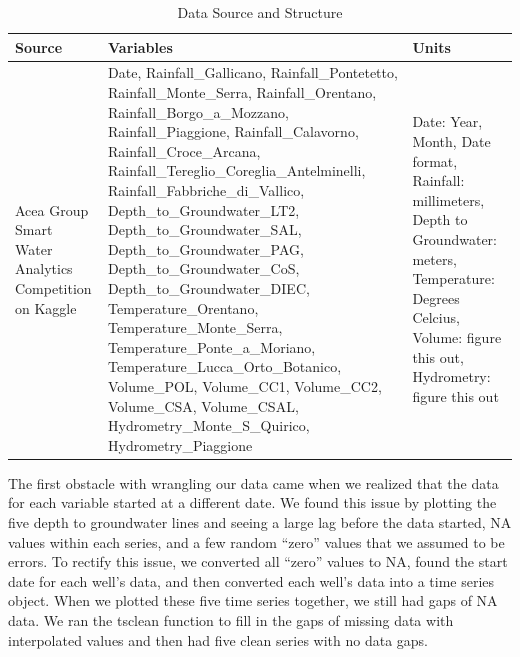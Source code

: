 \documentclass[
]{article}
\begin{document}
\begin{table}[!h]

\caption{\label{tab:unnamed-chunk-2}Data Source and Structure}
\centering
\begin{tabular}[t]{l|l|l}
\hline
Source & Variables & Units\\
\hline
Acea Group Smart Water Analytics Competition on Kaggle & Date, Rainfall\_Gallicano, Rainfall\_Pontetetto, Rainfall\_Monte\_Serra,
                Rainfall\_Orentano, Rainfall\_Borgo\_a\_Mozzano, Rainfall\_Piaggione,
                Rainfall\_Calavorno, Rainfall\_Croce\_Arcana, 
                Rainfall\_Tereglio\_Coreglia\_Antelminelli, Rainfall\_Fabbriche\_di\_Vallico, 
                Depth\_to\_Groundwater\_LT2, Depth\_to\_Groundwater\_SAL, Depth\_to\_Groundwater\_PAG, 
                Depth\_to\_Groundwater\_CoS, Depth\_to\_Groundwater\_DIEC, Temperature\_Orentano, 
                Temperature\_Monte\_Serra, Temperature\_Ponte\_a\_Moriano, 
                Temperature\_Lucca\_Orto\_Botanico, Volume\_POL, Volume\_CC1, Volume\_CC2, 
                Volume\_CSA, Volume\_CSAL, Hydrometry\_Monte\_S\_Quirico, Hydrometry\_Piaggione & Date: Year, Month, Date format, Rainfall: millimeters, Depth to Groundwater: 
                meters, Temperature: Degrees Celcius, Volume: figure this out, Hydrometry:
                figure this out\\
\hline
\end{tabular}
\end{table}

The first obstacle with wrangling our data came when we realized that
the data for each variable started at a different date. We found this
issue by plotting the five depth to groundwater lines and seeing a large
lag before the data started, NA values within each series, and a few
random ``zero'' values that we assumed to be errors. To rectify this
issue, we converted all ``zero'' values to NA, found the start date for
each well's data, and then converted each well's data into a time series
object. When we plotted these five time series together, we still had
gaps of NA data. We ran the tsclean function to fill in the gaps of
missing data with interpolated values and then had five clean series
with no data gaps.
\end{document}

